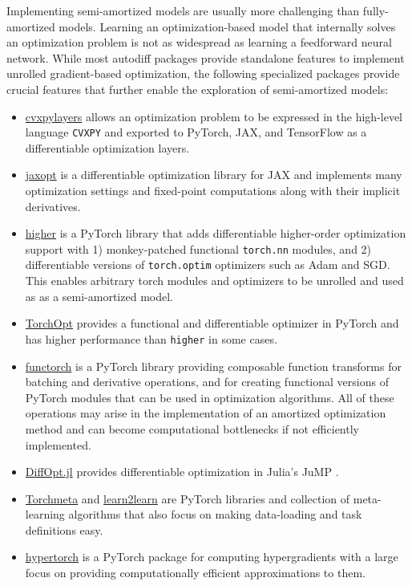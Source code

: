 \documentclass[twoside,11pt]{article}
\begin{document}
Implementing semi-amortized models are usually more challenging
than fully-amortized models. Learning an optimization-based
model that internally solves an optimization problem is
not as widespread as learning a feedforward neural network.
While most autodiff packages provide standalone features to implement
unrolled gradient-based optimization, the following specialized
packages provide crucial features that further enable the
exploration of semi-amortized models:
\begin{itemize}
\item \href{https://github.com/cvxgrp/cvxpylayers}{cvxpylayers}
  \citep{agrawal2019differentiable}
  allows an optimization problem to be expressed in the
  high-level language \verb!CVXPY! \citep{diamond2016cvxpy}
  and exported to PyTorch, JAX, and TensorFlow
  as a differentiable optimization layers.
\item \href{https://github.com/google/jaxopt}{jaxopt}
  \citep{blondel2021efficient}
  is a differentiable optimization library for JAX
  and implements many optimization settings and fixed-point
  computations along with their implicit derivatives.
\item \href{https://github.com/facebookresearch/higher}{higher}
  \citep{grefenstette2019generalized}
  is a PyTorch library that adds differentiable higher-order
  optimization support with
  1) monkey-patched functional \verb!torch.nn! modules,
  and 2) differentiable versions of \verb!torch.optim!
  optimizers such as Adam and SGD.
  This enables arbitrary torch modules and optimizers
  to be unrolled and used as as a semi-amortized model.
\item \href{https://github.com/metaopt/TorchOpt}{TorchOpt}
  provides a functional and differentiable optimizer in PyTorch
  and has higher performance than \verb!higher! in some cases.
\item \href{https://github.com/pytorch/functorch}{functorch}
  \citep{functorch2021} is a PyTorch library providing
  composable function transforms for batching and
  derivative operations, and for creating functional
  versions of PyTorch modules that can be used in
  optimization algorithms.
  All of these operations may arise in the implementation
  of an amortized optimization method and can become computational
  bottlenecks if not efficiently implemented.
\item \href{https://github.com/jump-dev/DiffOpt.jl}{DiffOpt.jl}
  provides differentiable optimization in Julia's JuMP
  \citep{DunningHuchetteLubin2017}.
\item \href{https://github.com/tristandeleu/pytorch-meta}{Torchmeta}
  \citep{deleu2019torchmeta} and
  \href{http://learn2learn.net}{learn2learn}
  \citep{arnold2020learn2learn}
  are PyTorch libraries and collection of meta-learning
  algorithms that also focus on making data-loading
  and task definitions easy.
\item \href{https://github.com/prolearner/hypertorch}{hypertorch}
  \citep{grazzi2020iteration}
  is a PyTorch package for computing hypergradients with a
  large focus on providing computationally efficient approximations
  to them.
\end{itemize}
\end{document}
